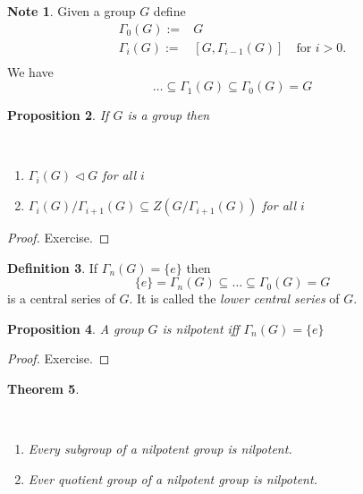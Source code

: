 \documentclass[12pt, letterpaper, oneside]{article}
\theoremstyle{plain}
\newtheorem{theorem}{Theorem}[section]
\newtheorem{proposition}[theorem]{Proposition}
\theoremstyle{definition}
\newtheorem{definition}[theorem]{Definition}
\newtheorem{note}[theorem]{Note}
\newcommand{\benu}{\begin{enumerate}}
\newcommand{\eenu}{\end{enumerate}}
\newcommand{\vs}{\vskip 5mm}
\newcommand{\isep}[1][0]{\setlength{\itemsep}{#1 mm}}
\begin{document}
\vs\vs

\begin{note}
Given a group $G$ define
\begin{align*}
\Gamma_{0}(G) := & G \\
\Gamma_{i}(G) := & [G, \Gamma_{i-1}(G)] \ \ \  \text{ for $i>0$}.\\
\end{align*} 
We have  
$$ {\dots}  \subseteq \Gamma_{1}(G) \subseteq \Gamma_{0}(G) = G $$
\end{note}


\vs\vs

\begin{proposition} If $G$ is a group then
\vskip -13mm

\ 
\benu
\isep
\item $\Gamma_{i}(G) \lhd G$ for all $i$ 
\item $\Gamma_{i}(G)/\Gamma_{i+1}(G) \subseteq Z(G/\Gamma_{i+1}(G))$ for all $i$
\eenu
\end{proposition}

\vs

\begin{proof}
Exercise.
\end{proof}

\vs\vs

\begin{definition}
If $\Gamma_{n}(G) = \{e\}$ then 
$$\{e\} = \Gamma_{n}(G) \subseteq {\dots} \subseteq \Gamma_{0}(G) = G$$
is a central series of $G$. It is called the \emph{lower central series} of $G$.
\end{definition}

\vs\vs

\begin{proposition}
\label{PROP_LOCENTRALNIL}
A group $G$ is nilpotent iff $\Gamma_{n}(G) = \{e\}$
\end{proposition}


\begin{proof}
Exercise.
\end{proof}

\vs\vs


\begin{theorem}\ 
\label{THM_NILPGPSSUBQUOTEXT}
\vskip -13mm

\ 
\benu
\isep
\item Every subgroup of a nilpotent  group is nilpotent.
\item Ever quotient group of a nilpotent group is nilpotent.
\eenu
\end{theorem}
\end{document}

